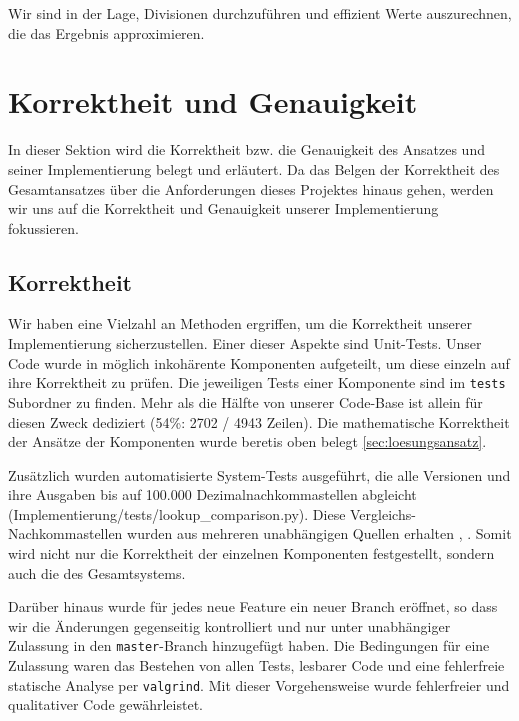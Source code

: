 \documentclass[course=erap]{aspdoc}
\begin{document}
Wir sind in der Lage, Divisionen durchzuführen und effizient Werte auszurechnen, die das Ergebnis approximieren.

\section{Korrektheit und Genauigkeit} \label{sec:genauigkeit}
In dieser Sektion wird die Korrektheit bzw. die Genauigkeit des Ansatzes und seiner Implementierung belegt und erläutert. Da das Belgen der Korrektheit des Gesamtansatzes über die Anforderungen dieses Projektes hinaus gehen, werden wir uns auf die Korrektheit und Genauigkeit unserer Implementierung fokussieren.

\subsection{Korrektheit}
Wir haben eine Vielzahl an Methoden ergriffen, um die Korrektheit unserer Implementierung sicherzustellen. Einer dieser Aspekte sind Unit-Tests. Unser Code wurde in möglich inkohärente Komponenten aufgeteilt, um diese einzeln auf ihre Korrektheit zu prüfen. Die jeweiligen Tests einer Komponente sind im \texttt{tests} Subordner zu finden. Mehr als die Hälfte von unserer Code-Base ist allein für diesen Zweck dediziert (54\%: 2702 / 4943 Zeilen). Die mathematische Korrektheit der Ansätze der Komponenten wurde beretis oben belegt \ref{sec:loesungsansatz}.


Zusätzlich wurden automatisierte System-Tests ausgeführt, die alle Versionen und ihre Ausgaben bis auf 100.000 Dezimalnachkommastellen abgleicht (Implementierung/tests/lookup\_comparison.py). Diese Vergleichs-Nachkommastellen wurden aus mehreren unabhängigen Quellen erhalten \cite{sqrt2_Quelle}, \cite{sqrt2_Quelle2}. Somit wird nicht nur die Korrektheit der einzelnen Komponenten festgestellt, sondern auch die des Gesamtsystems.

Darüber hinaus wurde für jedes neue Feature ein neuer Branch eröffnet, so dass wir die Änderungen gegenseitig kontrolliert und nur unter unabhängiger Zulassung in den \texttt{master}-Branch hinzugefügt haben. Die Bedingungen für eine Zulassung waren das Bestehen von allen Tests, lesbarer Code und eine fehlerfreie statische Analyse per \texttt{valgrind}. Mit dieser Vorgehensweise wurde fehlerfreier und qualitativer Code gewährleistet.
\end{document}

